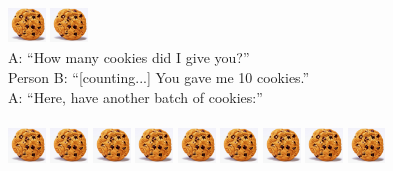 \documentclass[12pt]{article}
\begin{document}
\includegraphics[height=10mm, width=10mm]{cookie.jpg}
\includegraphics[height=10mm, width=10mm]{cookie.jpg}
\\
A: ``How many cookies did I give you?''\\
Person B: ``[counting...] You gave me 10 cookies.''\\
A: ``Here, have another batch of cookies:''\\
\\
\includegraphics[height=10mm, width=10mm]{cookie.jpg}
\includegraphics[height=10mm, width=10mm]{cookie.jpg}
\includegraphics[height=10mm, width=10mm]{cookie.jpg}
\includegraphics[height=10mm, width=10mm]{cookie.jpg}
\includegraphics[height=10mm, width=10mm]{cookie.jpg}
\includegraphics[height=10mm, width=10mm]{cookie.jpg}
\includegraphics[height=10mm, width=10mm]{cookie.jpg}
\includegraphics[height=10mm, width=10mm]{cookie.jpg}
\includegraphics[height=10mm, width=10mm]{cookie.jpg}
\end{document}
